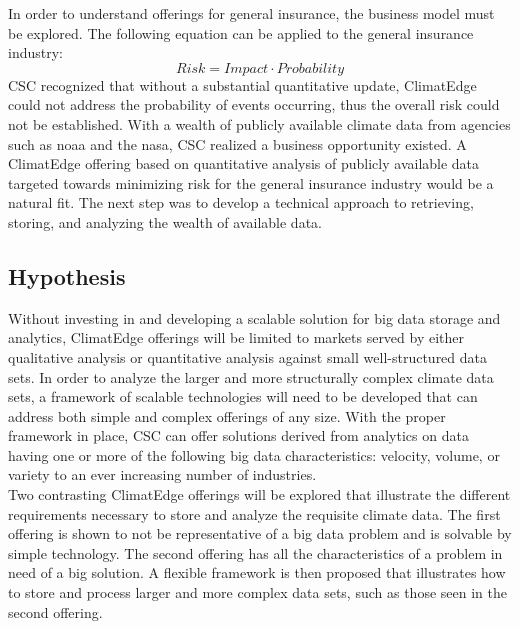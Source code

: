 In order to understand offerings for general insurance, the business model must be explored. The following equation can be applied to the general insurance industry: 
\begin{equation*}
    Risk = Impact \cdot Probability
\end{equation*}
\textsc{CSC} recognized that without a substantial quantitative update, ClimatEdge could not address the probability of events occurring, thus the overall risk could not be established. With a wealth of publicly available climate data from agencies such as \gls{noaa} and the \gls{nasa}, \textsc{CSC} realized a business opportunity existed. A ClimatEdge offering based on quantitative analysis of publicly available data targeted towards minimizing risk for the general insurance industry would be a natural fit. The next step was to develop a technical approach to retrieving, storing, and analyzing the wealth of available data. 
\subsection{Hypothesis}
Without investing in and developing a scalable solution for big data  storage and analytics, ClimatEdge offerings will be limited to markets served by either qualitative analysis or quantitative analysis against small well-structured data sets. In order to analyze the larger and more structurally complex climate data sets, a framework of scalable technologies will need to be developed that can address both simple and complex offerings of any size. With the proper framework in place, \textsc{CSC} can offer solutions derived from analytics on data having one or more of the following big data characteristics: velocity, volume, or variety to an ever increasing number of industries.\\
 
Two contrasting ClimatEdge offerings will be explored that illustrate the different requirements necessary to store and analyze the requisite climate data. The first offering is shown to not be representative of a big data problem and is solvable by simple technology. The second offering has all the characteristics of a problem in need of a big solution. A flexible framework is then proposed that illustrates how to store and process larger and more complex data sets, such as those seen in the second offering.
